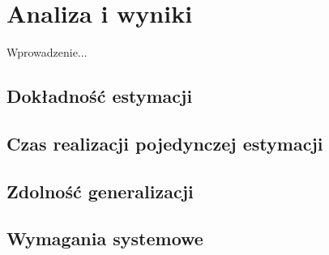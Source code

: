 \chapter{Analiza i wyniki}\label{chap:analiza_i_wyniki}

Wprowadzenie...

\section{Dokładność estymacji}

\section{Czas realizacji pojedynczej estymacji}

\section{Zdolność generalizacji}

\section{Wymagania systemowe}